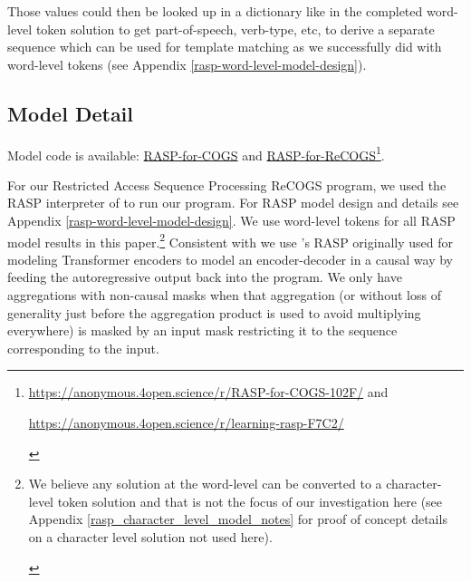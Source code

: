 \documentclass[11pt]{article}
\begin{document}
Those values could then be looked up in a dictionary like in the completed word-level token solution to get part-of-speech, verb-type, etc, to derive a separate sequence which can be used for template matching as we successfully did with word-level tokens (see Appendix \ref{rasp-word-level-model-design}).

\clearpage
\subsection{Model Detail}
\label{model_detail}
Model code is available: \href{https://anonymous.4open.science/r/RASP-for-COGS-102F/}{RASP-for-COGS} and \href{https://anonymous.4open.science/r/learning-rasp-F7C2/}{RASP-for-ReCOGS}\footnote{\href{https://anonymous.4open.science/r/RASP-for-COGS-102F/}{https://anonymous.4open.science/r/RASP-for-COGS-102F/} and \begin{footnotesize}\href{https://anonymous.4open.science/r/learning-rasp-F7C2/}{https://anonymous.4open.science/r/learning-rasp-F7C2/}
\end{footnotesize}
}.

For our Restricted Access Sequence Processing ReCOGS program, we used the RASP interpreter of \cite{Weiss2021} to run our program. For RASP model design and details see Appendix \ref{rasp-word-level-model-design}. We use word-level tokens for all RASP model results in this paper.\footnote{\begin{footnotesize}We believe any solution at the word-level can be converted to a character-level token solution and that is not the focus of our investigation here (see Appendix \ref{rasp_character_level_model_notes} for proof of concept details on a character level solution not used here).\end{footnotesize}}
Consistent with \cite{Zhou2024} we use \cite{Weiss2021}'s RASP originally used for modeling Transformer encoders to model an encoder-decoder in a causal way by feeding the autoregressive output back into the program. We only have aggregations with non-causal masks when that aggregation (or without loss of generality just before the aggregation product is used to avoid multiplying everywhere) is masked by an input mask restricting it to the sequence corresponding to the input.
\end{document}
